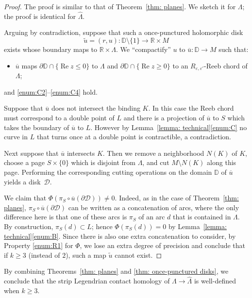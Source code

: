 \documentclass[JEP,XML,SOM,Unicode,NoFloatCountersInSection]{cedram}
\let\mathcal\mathscr
\let\ra\rightarrow
\theoremstyle{plain}
\theoremstyle{definition}
\numberwithin{equation}{subsection}
\newcommand{\RR}{\mathbb{R}}
\newcommand{\bdry}{\partial}
\let\op\operatorname
\begin{document}
\begin{proof}
The proof is similar to that of Theorem~\ref{thm: planes}. We sketch it for $\Lambda$; the proof is identical for $\widehat{\Lambda}$.

Arguing by contradiction, suppose that such a once-punctured holomorphic disk
$$\widetilde u=(r,u): \mathbb{D}\setminus \{1\}\to \RR\times M$$
exists whose boundary maps to $\RR\times \Lambda$. We ``compactify'' $u$ to $\overline{u}: \mathbb{D}\to M$
such that:
\begin{itemize}
\item[(C1')] $\overline{u}$ maps $\bdry \mathbb{D} \cap \{\op{Re} z\leq 0\}$ to $\Lambda$ and $\bdry\mathbb{D}\cap \{\op{Re} z\geq 0\}$ to an $R_{\varepsilon,\varepsilon'}$-Reeb chord of $\Lambda$;
\end{itemize}
and \eqref{enum:C2}--\eqref{enum:C4} hold.

Suppose that $\overline{u}$ does not intersect the binding $K$. In this case the Reeb chord must correspond to a double point of $L$ and there is a projection of $\overline{u}$ to $S$ which takes the boundary of $\overline{u}$ to $L$. However by Lemma~\ref{lemma: technical}\eqref{enum:C} no curve in $L$ that turns once at a double point is contractible, a contradiction.

Next suppose that $\overline{u}$ intersects $K$. Then we remove a neighborhood $N(K)$ of $K$, choose a page $S\times\{0\}$ which is disjoint from $\Lambda$, and cut $M\setminus N(K)$ along this page. Performing the corresponding cutting operations on the domain $\mathbb{D}$ of $\overline{u}$ yields a disk~$\mathcal{D}$.

We claim that $\Phi(\pi_S\circ \overline{u}(\bdry \mathcal{D}))\not=0$. Indeed, as in the case of Theorem~\ref{thm: planes}, $\pi_S\circ \overline{u}(\bdry \mathcal{D})$ can be written as a concatenation of arcs, where the only difference here is that one of these arcs is $\pi_S$ of an arc $d$ that is contained in $\Lambda$. By construction, $\pi_S(d)\subset L$; hence $\Phi(\pi_S(d))=0$ by Lemma~\ref{lemma: technical}\eqref{enum:B}. Since there is also one extra concatenation to consider, by Property \eqref{enum:R1} for $\Phi$, we lose an extra degree of precision and conclude that if $k\geq 3$ (instead of $2$), such a map $\widetilde u$ cannot exist.
\end{proof}

By combining Theorems~\ref{thm: planes} and \ref{thm: once-punctured disks}, we conclude that the strip Legendrian contact homology of $\Lambda\ra \widehat{\Lambda}$ is well-defined when $k\geq 3$.
\end{document}
